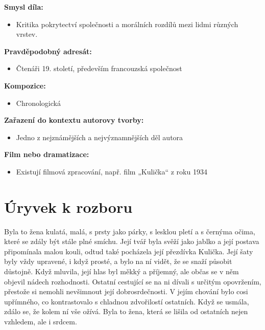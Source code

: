 \documentclass[12pt,a4paper]{article}
\begin{document}
\begin{tcolorbox}[breakable]
\textbf{Smysl díla:}
\begin{itemize}
\item Kritika pokrytectví společnosti a morálních rozdílů mezi lidmi různých vrstev.
\end{itemize}

\textbf{Pravděpodobný adresát:}
\begin{itemize}
\item Čtenáři 19. století, především francouzská společnost
\end{itemize}

\textbf{Kompozice:}
\begin{itemize}
\item Chronologická
\end{itemize}

\textbf{Zařazení do kontextu autorovy tvorby:}
\begin{itemize}
\item Jedno z nejznámějších a nejvýznamnějších děl autora
\end{itemize}

\textbf{Film nebo dramatizace:}
\begin{itemize}
\item Existují filmová zpracování, např. film „Kulička“ z roku 1934
\end{itemize}

\end{tcolorbox}

\section*{Úryvek k rozboru}

Byla to žena kulatá, malá, s prsty jako párky, s lesklou pletí a s černýma očima, které se zdály být stále plné smíchu. Její tvář byla svěží jako jablko a její postava připomínala malou kouli, odtud také pocházela její přezdívka Kulička. Její šaty byly vždy upravené, i když prosté, a bylo na ní vidět, že se snaží působit důstojně. Když mluvila, její hlas byl měkký a příjemný, ale občas se v něm objevil nádech rozhodnosti. Ostatní cestující se na ni dívali s určitým opovržením, přestože si nemohli nevšimnout její dobrosrdečnosti. V jejím chování bylo cosi upřímného, co kontrastovalo s chladnou zdvořilostí ostatních. Když se usmála, zdálo se, že kolem ní vše ožívá. Byla to žena, která se lišila od ostatních nejen vzhledem, ale i srdcem.
\end{document}
